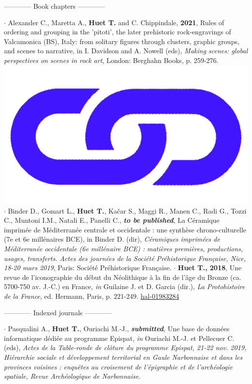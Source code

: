 \documentclass{article}
\begin{document}
\bigbreak
\begin{center}------------ Book chapters ------------\end{center}
\smallbreak
$\cdot$ Alexander C., Maretta A., \textbf{Huet T.} and C. Chippindale, \textbf{2021}, Rules of ordering and grouping in the 'pitoti', the later prehistoric rock-engravings of Valcamonica (BS), Italy: from solitary figures through clusters, graphic groups, and scenes to narrative, in I. Davidson and A. Nowell (eds), \textit{Making scenes: global perspectives on scenes in rock art}, London: Berghahn Books, p. 259-276.\href{https://www.berghahnbooks.com/title/DavidsonMaking}{\includegraphics[scale=0.02]{link_darkblue.png}}
\smallbreak
$\cdot$ Binder D., Gomart L., \textbf{Huet T.}, Ka{\v{c}}ar S., Maggi R., Manen C., Radi G., Tozzi C., Muntoni I.M., Natali E., Panelli C., \textit{\textbf{to be published}}, La C\'{e}ramique imprim\'{e}e de M\'{e}diterran\'{e}e centrale et occidentale : une synthèse chrono-culturelle (7e et 6e millénaires BCE), in Binder D. (dir), \textit{C\'{e}ramiques imprim\'{e}es de M\'{e}diterran\'{e}e occidentale (6e mill\'{e}naire BCE) : matières premières, productions, usages, transferts. Actes des journ\'{e}es de la Soci\'{e}t\'{e} Pr\'{e}historique Française, Nice, 18-20 mars 2019}, Paris: Soci\'{e}t\'{e} Pr\'{e}historique Française.
\smallbreak
$\cdot$ \textbf{Huet T., 2018}, Une revue de l'iconographie du d\'{e}but du N\'{e}olithique \`{a} la fin de l'\^{a}ge du Bronze (ca. 5700-750 av. J.-C.) en France, \textit{in} Guilaine J. et D. Garcia (dir.), \textit{La Protohistoire de la France}, ed. Hermann, Paris, p. 221-249. \href{https://hal.archives-ouvertes.fr/hal-01983284}{hal-01983284}
\bigbreak
\begin{center}------------ Indexed journals ------------\end{center}
\smallbreak
$\cdot$ Pasqualini A., \textbf{Huet T.}, Ouriachi M.-J., \textit{\textbf{submitted}}, Une base de données informatique dédiée au programme Epispat, \textit{in} Ouriachi M.-J. et Pellecuer C. (eds), \textit{Actes de la Table-ronde de cl\^{o}ture du programme Epispat, 21-22 nov. 2019, Hi\'{e}rarchie sociale et d\'{e}veloppement territorial en Gaule Narbonnaise et dans les provinces voisines : enqu\^{e}tes au croisement de l'\'{e}pigraphie et de l'arch\'{e}ologie spatiale, Revue Arch\'{e}ologique de Narbonnaise}.
\end{document}
